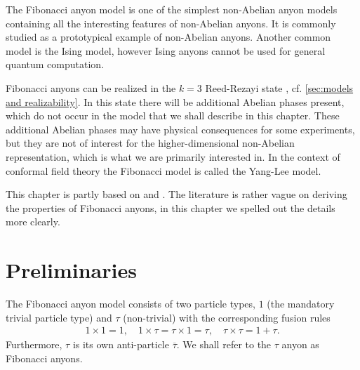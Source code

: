 \documentclass[a4paper,10pt,oneside]{book}
\theoremstyle{plain}
\theoremstyle{definition}
\theoremstyle{remark}
\begin{document}
The Fibonacci anyon model is one of the simplest non-Abelian anyon models containing all the interesting features of non-Abelian anyons. It is commonly studied as a prototypical example of non-Abelian anyons. Another common model is the Ising model, however Ising anyons cannot be used for general quantum computation.

Fibonacci anyons can be realized in the $k=3$ Reed-Rezayi state \cite{topological quantum compiling}, cf. \cref{sec:models and realizability}. In this state there will be additional Abelian phases present, which do not occur in the model that we shall describe in this chapter. These additional Abelian phases may have physical consequences for some experiments, but they are not of interest for the higher-dimensional non-Abelian representation, which is what we are primarily interested in. In the context of conformal field theory the Fibonacci model is called the Yang-Lee model.

This chapter is partly based on \cite{preskill} and \cite{topological quantum compiling}. The literature is rather vague on deriving the properties of Fibonacci anyons, in this chapter we spelled out the details more clearly.

\section{Preliminaries}\label{sec:fibonacci fusion space examples}

The Fibonacci anyon model consists of two particle types, $1$ (the mandatory trivial particle type) and $τ$ (non-trivial) with the corresponding fusion rules
\begin{align*}
  1 \times 1 = 1, \quad
  1 \times τ = τ \times 1 = τ, \quad
  τ \times τ = 1 + τ.
\end{align*}
Furthermore, $\tau$ is its own anti-particle $\overline{τ}$. We shall refer to the $τ$ anyon as Fibonacci anyons.
\end{document}
